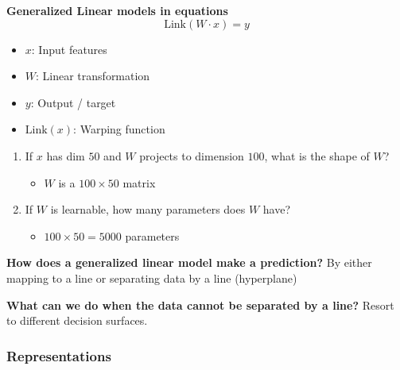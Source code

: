 \documentclass[twoside]{article}
\begin{document}
\begin{example} \textbf{Generalized Linear models in equations}
    \begin{equation}
        \text{Link}(W \cdot x) = y
    \end{equation}
    \begin{itemize}
        \item $x$: Input features
        \item $W$: Linear transformation
        \item $y$: Output / target
        \item $\text{Link}(x)$: Warping function
    \end{itemize}
    \begin{enumerate}
        \item If $x$ has dim $50$ and $W$ projects to dimension $100$, what is the shape of $W$?
        \begin{itemize}
            \item $W$ is a $100 \times 50$ matrix
        \end{itemize}
        \item If $W$ is learnable, how many parameters does $W$ have?
        \begin{itemize}
            \item $100 \times 50 = 5000$ parameters
        \end{itemize}
    \end{enumerate}
    
\end{example}

\begin{notes} \textbf{How does a generalized linear model make a prediction?}
    By either mapping to a line or separating data by a line (hyperplane)
\end{notes}

\begin{notes} \textbf{What can we do when the data cannot be separated by a line?}
    Resort to different decision surfaces.
\end{notes}

\subsubsection{Representations}
\begin{notes}
\end{notes}
\end{document}
